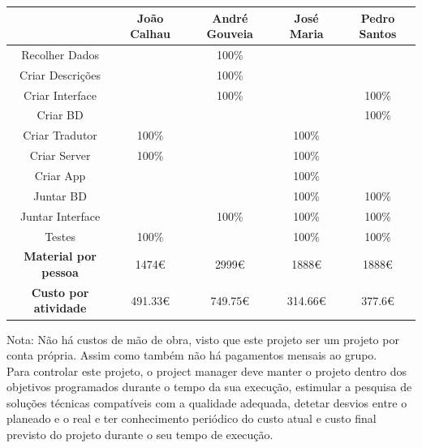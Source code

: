 \documentclass[a4paper]{article}
\begin{document}
\begin{table}[!ht]
    \begin{tabular}{|c|c|c|c|c|}
    \hline
    ~                   & João Calhau & André Gouveia & José Maria & Pedro Santos \\ \hline
    Recolher Dados      & ~           & 100\%         & ~          & ~            \\ \hline
    Criar Descrições    & ~           & 100\%         & ~          & ~            \\ \hline
    Criar Interface     & ~           & 100\%         & ~          & 100\%        \\ \hline
    Criar BD            & ~           & ~             & ~          & 100\%        \\ \hline
    Criar Tradutor      & 100\%       & ~             & 100\%      & ~            \\ \hline
    Criar Server        & 100\%       & ~             & 100\%      & ~            \\ \hline
    Criar App           & ~           & ~             & 100\%      & ~            \\ \hline
    Juntar BD           & ~           & ~             & 100\%      & 100\%        \\ \hline
    Juntar Interface    & ~           & 100\%         & 100\%      & 100\%        \\ \hline
   	Testes              & 100\%       & ~             & 100\%      & 100\%        \\ \hline
    \hline
    \textbf{Material por pessoa}    & 1474\euro   & 2999\euro     & 1888\euro  & 1888\euro    \\ \hline
    \textbf{Custo por atividade} & 491.33\euro    & 749.75\euro   & 314.66\euro & 377.6\euro     \\ \hline
    \end{tabular}
\end{table}

Nota: Não há custos de mão de obra, visto que este projeto ser um projeto por conta própria. Assim como também não há pagamentos mensais ao grupo.\\

Para controlar este projeto, o project manager deve manter o projeto dentro dos objetivos programados durante o tempo da sua execução, estimular a pesquisa de soluções técnicas compatíveis com a qualidade adequada, detetar desvios entre o planeado e o real e ter conhecimento periódico do custo atual e custo final previsto do projeto durante o seu tempo de execução. 
\end{document}
